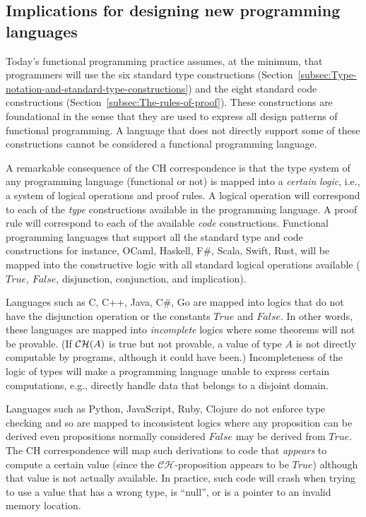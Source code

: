 \subsection{Implications for designing new programming languages}

Today\textsf{'}s functional programming practice assumes, at the minimum, that
programmers will use the six standard type constructions (Section~\ref{subsec:Type-notation-and-standard-type-constructions})
and the eight standard code constructions (Section~\ref{subsec:The-rules-of-proof}).
These constructions are foundational in the sense that they are used
to express all design patterns of functional programming. A language
that does not directly support some of these constructions cannot
be considered a functional programming language.

A remarkable consequence of the CH correspondence is that the type
system of any programming language (functional or not) is mapped into
a \emph{certain} \emph{logic}, i.e., a system of logical operations
and proof rules. A logical operation will correspond to each of the
\emph{type} constructions available in the programming language. A
proof rule will correspond to each of the available \emph{code} constructions.
Functional programming languages that support all the standard type
and code constructions \textemdash{} for instance, OCaml, Haskell,
F\#, Scala, Swift, Rust, \textemdash{} will be mapped into the constructive
logic with all standard logical operations available ($True$, $False$,
disjunction, conjunction, and implication).

Languages such as C, C++, Java, C\#, Go are mapped into logics that
do not have the disjunction operation or the constants $True$ and
$False$. In other words, these languages are mapped into \emph{incomplete}
logics where some theorems will not be provable. (If ${\cal CH}(A)$
is true but not provable, a value of type $A$ is not directly computable
by programs, although it could have been.) Incompleteness of the logic
of types will make a programming language unable to express certain
computations, e.g., directly handle data that belongs to a disjoint
domain. 

Languages such as Python, JavaScript, Ruby, Clojure do not enforce
type checking and so are mapped to inconsistent logics where any proposition
can be derived \textemdash{} even propositions normally considered
$False$ may be derived from $True$. The CH correspondence will map
such derivations to code that \emph{appears} to compute a certain
value (since the $\mathcal{CH}$-proposition appears to be $True$)
although that value is not actually available. In practice, such code
will crash when trying to use a value that has a wrong type, is \textsf{``}null\textsf{''},
or is a pointer to an invalid memory location.

